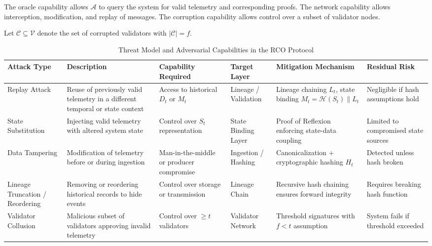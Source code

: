The oracle capability allows $\mathcal{A}$ to query the system for valid telemetry and corresponding proofs. The network capability allows interception, modification, and replay of messages. The corruption capability allows control over a subset of validator nodes.

Let $\mathcal{C} \subseteq \mathcal{V}$ denote the set of corrupted validators with $|\mathcal{C}| = f$.

\begin{table}[htbp]
\footnotesize
\centering
\caption{Threat Model and Adversarial Capabilities in the RCO Protocol}
\label{tab:threat-model}

\renewcommand{\arraystretch}{1.25}

\begin{tabularx}{\textwidth}{|p{2.8cm}|X|p{2.5cm}|X|X|p{2.2cm}|}
\hline
\textbf{Attack Type} & \textbf{Description} & \textbf{Capability Required} & \textbf{Target Layer} & \textbf{Mitigation Mechanism} & \textbf{Residual Risk} \\
\hline

Replay Attack & Reuse of previously valid telemetry in a different temporal or state context & Access to historical $D_t$ or $M_t$ & Lineage / Validation & Lineage chaining $L_t$, state binding $M_t = \mathcal{H}(S_t) \parallel L_t$ & Negligible if hash assumptions hold \\

\hline

State Substitution & Injecting valid telemetry with altered system state & Control over $S_t$ representation & State Binding Layer & Proof of Reflexion enforcing state-data coupling & Limited to compromised state sources \\

\hline

Data Tampering & Modification of telemetry before or during ingestion & Man-in-the-middle or producer compromise & Ingestion / Hashing & Canonicalization + cryptographic hashing $H_t$ & Detected unless hash broken \\

\hline

Lineage Truncation / Reordering & Removing or reordering historical records to hide events & Control over storage or transmission & Lineage Chain & Recursive hash chaining ensures forward integrity & Requires breaking hash function \\

\hline

Validator Collusion & Malicious subset of validators approving invalid telemetry & Control over $\geq t$ validators & Validator Network & Threshold signatures with $f < t$ assumption & System fails if threshold exceeded \\


\end{tabularx}
\end{table}
